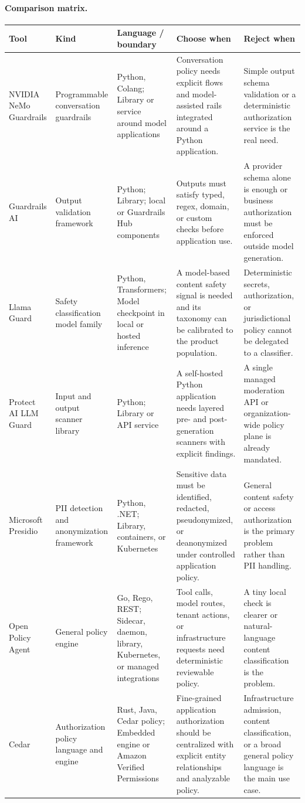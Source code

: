 \paragraph{Comparison matrix.}
\begin{longtable}{@{}p{20mm}p{22mm}p{26mm}p{46mm}p{46mm}@{}}
\toprule\textbf{Tool} & \textbf{Kind} & \textbf{Language / boundary} & \textbf{Choose when} & \textbf{Reject when}\\\midrule\endhead
NVIDIA NeMo Guardrails & Programmable conversation guardrails & Python, Colang; Library or service around model applications & Conversation policy needs explicit flows and model-assisted rails integrated around a Python application. & Simple output schema validation or a deterministic authorization service is the real need.\\
Guardrails AI & Output validation framework & Python; Library; local or Guardrails Hub components & Outputs must satisfy typed, regex, domain, or custom checks before application use. & A provider schema alone is enough or business authorization must be enforced outside model generation.\\
Llama Guard & Safety classification model family & Python, Transformers; Model checkpoint in local or hosted inference & A model-based content safety signal is needed and its taxonomy can be calibrated to the product population. & Deterministic secrets, authorization, or jurisdictional policy cannot be delegated to a classifier.\\
Protect AI LLM Guard & Input and output scanner library & Python; Library or API service & A self-hosted Python application needs layered pre- and post-generation scanners with explicit findings. & A single managed moderation API or organization-wide policy plane is already mandated.\\
Microsoft Presidio & PII detection and anonymization framework & Python, .NET; Library, containers, or Kubernetes & Sensitive data must be identified, redacted, pseudonymized, or deanonymized under controlled application policy. & General content safety or access authorization is the primary problem rather than PII handling.\\
Open Policy Agent & General policy engine & Go, Rego, REST; Sidecar, daemon, library, Kubernetes, or managed integrations & Tool calls, model routes, tenant actions, or infrastructure requests need deterministic reviewable policy. & A tiny local check is clearer or natural-language content classification is the problem.\\
Cedar & Authorization policy language and engine & Rust, Java, Cedar policy; Embedded engine or Amazon Verified Permissions & Fine-grained application authorization should be centralized with explicit entity relationships and analyzable policy. & Infrastructure admission, content classification, or a broad general policy language is the main use case.\\

\end{longtable}

